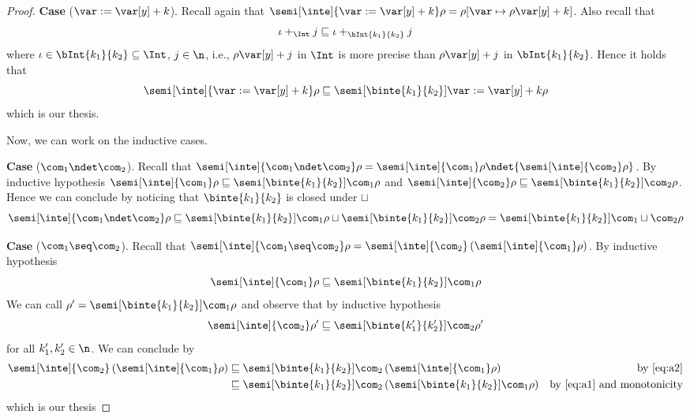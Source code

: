 \begin{proof}
  \medskip

  \noindent
  \textbf{Case} (\(\var := \var[y] + k\)).
  Recall again that
  \({\semi[\inte]{\var := \var[y] + k}\rho} = {\rho[\var \mapsto
    \rho\var[y] + k]}\). Also recall that
  \begin{equation*}
    \iota +_{\Int} j \sqsubseteq \iota +_{\bInt{k_1}{k_2}} j
  \end{equation*}
  where \(\iota \in \bInt{k_1}{k_2} \subseteq \Int\), \(j\in\n\),
  i.e., \(\rho\var[y] + j\) in \(\Int\) is more precise than
  \(\rho\var[y] + j\) in \(\bInt{k_1}{k_2}\). Hence it holds that
  \begin{equation*}
    {\semi[\inte]{\var := \var[y] + k}\rho} \sqsubseteq {\semi[\binte{k_1}{k_2}]{\var := \var[y] + k}\rho}
  \end{equation*}
  which is our thesis.

  \medskip
  \noindent
  Now, we can work on the inductive cases.

  \medskip

  \noindent
  \textbf{Case} (\(\com_1 \ndet \com_2\)).
  Recall that
  \({\semi[\inte]{\com_1 \ndet \com_2}\rho} =
  {\semi[\inte]{\com_1}\rho} \ndet {\semi[\inte]{\com_2}\rho}\). By
  inductive hypothesis
  \({\semi[\inte]{\com_1}\rho} \sqsubseteq
  {\semi[\binte{k_1}{k_2}]{\com_1}\rho}\) and
  \({\semi[\inte]{\com_2}\rho} \sqsubseteq
  {\semi[\binte{k_1}{k_2}]{\com_2}\rho}\). Hence we can conclude by noticing
  that \(\binte{k_1}{k_2}\) is closed under \(\sqcup\)
  \begin{equation*}
    \semi[\inte]{\com_1 \ndet \com_2}\rho \sqsubseteq
    \semi[\binte{k_1}{k_2}]{\com_1}\rho \sqcup \semi[\binte{k_1}{k_2}]{\com_2}\rho =
    \semi[\binte{k_1}{k_2}]{\com_1 \sqcup \com_2}\rho
  \end{equation*}

  \medskip

  \noindent
  \textbf{Case} (\(\com_1 \seq \com_2\)).
  Recall that
  \({\semi[\inte]{\com_1 \seq \com_2}\rho} =
  {\semi[\inte]{\com_2}\left(\semi[\inte]{\com_1}\rho\right)}\). By
  inductive hypothesis
  \begin{equation}\label{eq:a1}
    {\semi[\inte]{\com_1}\rho} \sqsubseteq {\semi[\binte{k_1}{k_2}]{\com_1}\rho}
  \end{equation}
  We can call \(\rho' = {\semi[\binte{k_1}{k_2}]{\com_1}\rho}\) and observe
  that by inductive hypothesis
  \begin{equation}\label{eq:a2} {\semi[\inte]{\com_2}\rho'}
    \sqsubseteq {\semi[\binte{k_1'}{k_2'}]{\com_2}\rho'}
  \end{equation}
  for all \(k_1',k_2'\in\n\). We can conclude by
  \begin{align*}
    {\semi[\inte]{\com_2}\left(\semi[\inte]{\com_1}\rho\right)} & \sqsubseteq {\semi[\binte{k_1}{k_2}]{\com_2}\left(\semi[\inte]{\com_1}\rho\right)} & \text{by \eqref{eq:a2}}\\
                                                                & \sqsubseteq {\semi[\binte{k_1}{k_2}]{\com_2}\left(\semi[\binte{k_1}{k_2}]{\com_1}\rho\right)} & \text{by \eqref{eq:a1} and monotonicity}
  \end{align*}
  which is our thesis


\end{proof}
